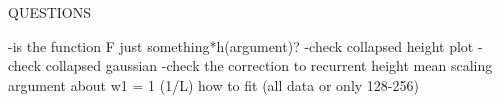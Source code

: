 \documentclass[12pt]{report}
\begin{document}

QUESTIONS

-is the function F just something*h(argument)?
-check collapsed height plot
-check collapsed gaussian
-check the correction to recurrent height mean scaling 
	argument about w1 = 1 (1/L)
	how to fit (all data or only 128-256)



















\end{document}
